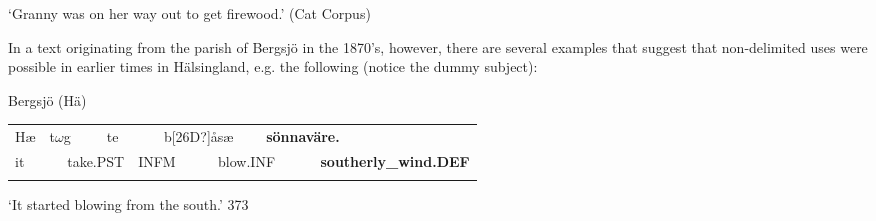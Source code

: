 \begin{styleTranslation}
‘Granny was on her way out to get firewood.’ (Cat Corpus)

\end{styleTranslation}

\begin{styleBodyTextFirst}
In a text originating from the parish of Bergsjö in the 1870’s, however, there are several examples that suggest that non-delimited uses were possible in earlier times in Hälsingland, e.g. the following (notice the dummy subject):

\end{styleBodyTextFirst}

\begin{listWWNumileveli}
\item {}

\begin{styleExample}
\label{bkm:Ref154221800}Bergsjö (Hä)

\end{styleExample}

\end{listWWNumileveli}

\begin{listWWNumxxxiiileveli}
\item {}

\end{listWWNumxxxiiileveli}

\begin{tabular}{llllllllll}
\lsptoprule
Hæ & \multicolumn{2}{l}{t$\omega $g

} & \multicolumn{2}{l}{te

} & \multicolumn{2}{l}{b[26D?]åsæ

} & \multicolumn{2}{l}{{\bfseries sönnaväre.}

} & \\
\multicolumn{2}{l}{it

} & \multicolumn{2}{l}{take.PST

} & \multicolumn{2}{l}{INFM

} & \multicolumn{2}{l}{blow.INF

} & \multicolumn{2}{l}{{\bfseries southerly\_wind.DEF}

}\\
\lspbottomrule
\end{tabular}

\begin{styleTranslation}
‘It started blowing from the south.’ 373

\end{styleTranslation}


